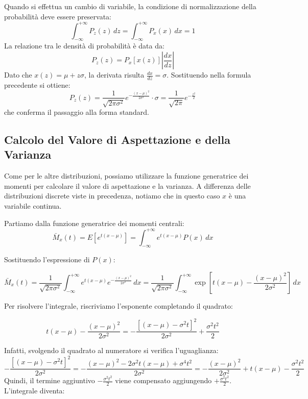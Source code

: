 \documentclass{article}
\theoremstyle{remark}
\begin{document}
\begin{nota}
Quando si effettua un cambio di variabile, la condizione di normalizzazione della probabilità deve essere preservata:
\[
\int_{-\infty}^{+\infty} P_z(z) \, dz = \int_{-\infty}^{+\infty} P_x(x) \, dx = 1
\]
La relazione tra le densità di probabilità è data da:
\[
P_z(z) = P_x [x(z)] \left| \frac{dx}{dz} \right|
\]
Dato che $x(z) = \mu + z\sigma$, la derivata risulta $\frac{dx}{dz} = \sigma$. Sostituendo nella formula precedente si ottiene:
\[
P_z(z) = \frac{1}{\sqrt{2 \pi \sigma^2}} e^{-\frac{(x-\mu)^2}{2\sigma^2}} \cdot \sigma = \frac{1}{\sqrt{2 \pi}} e^{-\frac{z^2}{2}}
\]
che conferma il passaggio alla forma standard.
\end{nota}

\subsection{Calcolo del Valore di Aspettazione e della Varianza}

Come per le altre distribuzioni, possiamo utilizzare la funzione generatrice dei momenti per calcolare il valore di aspettazione e la varianza. A differenza delle distribuzioni discrete viste in precedenza, notiamo che in questo caso $x$ è una variabile continua.

Partiamo dalla funzione generatrice dei momenti centrali:
\begin{equation}
\bar{M}_x(t) = E[e^{t(x-\mu)}] = \int_{-\infty}^{+\infty} e^{t(x-\mu)} P(x) \, dx
\end{equation}

Sostituendo l'espressione di $P(x)$:

\begin{equation}
\bar{M}_x(t) = \frac{1}{\sqrt{2\pi \sigma^2}} \int_{-\infty}^{+\infty} e^{t(x-\mu)} e^{-\frac{(x-\mu)^2}{2\sigma^2}} \, dx = \frac{1}{\sqrt{2\pi \sigma^2}} \int_{-\infty}^{+\infty} \exp \left[ t(x-\mu) - \frac{(x-\mu)^2}{2\sigma^2} \right] \, dx
\end{equation}

Per risolvere l'integrale, riscriviamo l'esponente completando il quadrato:

\begin{equation}
t(x-\mu) - \frac{(x-\mu)^2}{2\sigma^2} = - \frac{\left[ (x-\mu) - \sigma^2 t \right]^2}{2\sigma^2} + \frac{\sigma^2 t^2}{2}
\end{equation}

Infatti, svolgendo il quadrato al numeratore si verifica l'uguaglianza:
\begin{equation}
-\frac{\left[ (x-\mu) - \sigma^2 t \right]^2}{2\sigma^2} = -\frac{(x-\mu)^2 - 2 \sigma^2 t (x-\mu) + \sigma^4 t^2}{2\sigma^2} = -\frac{(x-\mu)^2}{2\sigma^2} + t(x-\mu) - \frac{\sigma^2 t^2}{2}
\end{equation}
Quindi, il termine aggiuntivo $-\frac{\sigma^2 t^2}{2}$ viene compensato aggiungendo $+\frac{\sigma^2 t^2}{2}$. L'integrale diventa:
\end{document}
